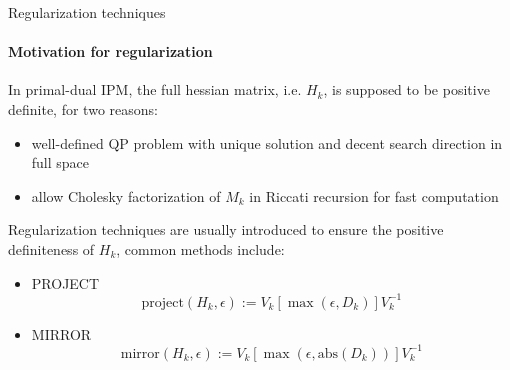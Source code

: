 \documentclass[10pt,aspectratio=1610]{beamer} %
\begin{document}
\begin{frame}{Regularization techniques}
    \framesubtitle{Motivation for regularization}
	In primal-dual IPM, the full hessian matrix, i.e. $H_k$, is supposed to be positive definite, for two reasons:
	\begin{itemize}
		\item well-defined QP problem with unique solution and decent search direction in full space
		\item allow Cholesky factorization of $M_k$ in Riccati recursion for fast computation
	\end{itemize}
	\vspace{1em}
	Regularization techniques are usually introduced to ensure the positive definiteness of $H_k$, common methods include:
	\begin{itemize}
		\item PROJECT
		\begin{equation*}
			\text{project}(H_k, \epsilon) := V_k [\max(\epsilon, D_k)] V_k^{-1}
		\end{equation*}
		\item MIRROR
		\begin{equation*}
			\text{mirror}(H_k, \epsilon) := V_k [\max(\epsilon, \text{abs}(D_k))] V_k^{-1}
		\end{equation*}
	\end{itemize}
\end{frame}
\end{document}
